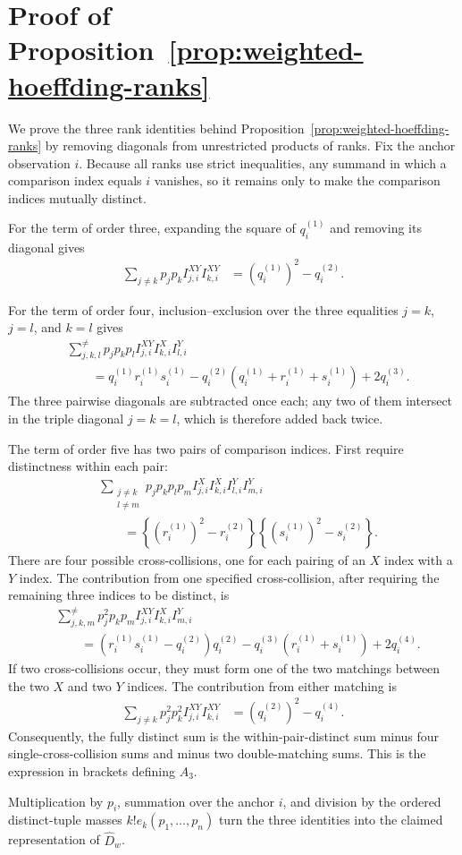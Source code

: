 \section{Proof of Proposition~\ref{prop:weighted-hoeffding-ranks}}
\label{app:hoeffding-identities}

We prove the three rank identities behind
Proposition~\ref{prop:weighted-hoeffding-ranks} by removing diagonals from
unrestricted products of ranks. Fix the anchor observation $i$. Because all
ranks use strict inequalities, any summand in which a comparison index equals
$i$ vanishes, so it remains only to make the comparison indices mutually
distinct.

For the term of order three, expanding the square of $q_i^{(1)}$ and removing
its diagonal gives
\begin{align*}
  \sum_{j\neq k}
  p_jp_k I_{j,i}^{XY}I_{k,i}^{XY}
  &= \left(q_i^{(1)}\right)^2-q_i^{(2)}.
\end{align*}

For the term of order four, inclusion--exclusion over the three equalities
$j=k$, $j=l$, and $k=l$ gives
\begin{align*}
  &\sum_{j,k,l}^{\neq}
  p_jp_kp_l I_{j,i}^{XY}I_{k,i}^X I_{l,i}^Y\\
  &\qquad=
  q_i^{(1)}r_i^{(1)}s_i^{(1)}
  -q_i^{(2)}
   \left(q_i^{(1)}+r_i^{(1)}+s_i^{(1)}\right)
  +2q_i^{(3)}.
\end{align*}
The three pairwise diagonals are subtracted once each; any two of them
intersect in the triple diagonal $j=k=l$, which is therefore added back
twice.

The term of order five has two pairs of comparison indices. First require
distinctness within each pair:
\begin{align*}
  &\sum_{\substack{j\neq k\\l\neq m}}
  p_jp_kp_lp_m I_{j,i}^X I_{k,i}^X I_{l,i}^Y I_{m,i}^Y\\
  &\qquad=
  \left\{\left(r_i^{(1)}\right)^2-r_i^{(2)}\right\}
  \left\{\left(s_i^{(1)}\right)^2-s_i^{(2)}\right\}.
\end{align*}
There are four possible cross-collisions, one for each pairing of an $X$
index with a $Y$ index. The contribution from one specified cross-collision,
after requiring the remaining three indices to be distinct, is
\begin{align*}
  &\sum_{j,k,m}^{\neq}
  p_j^2p_kp_m I_{j,i}^{XY}I_{k,i}^X I_{m,i}^Y\\
  &\qquad=
  \left(r_i^{(1)}s_i^{(1)}-q_i^{(2)}\right)q_i^{(2)}
  -q_i^{(3)}\left(r_i^{(1)}+s_i^{(1)}\right)
  +2q_i^{(4)}.
\end{align*}
If two cross-collisions occur, they must form one of the two matchings between
the two $X$ and two $Y$ indices. The contribution from either matching is
\begin{align*}
  \sum_{j\neq k}p_j^2p_k^2 I_{j,i}^{XY}I_{k,i}^{XY}
  &= \left(q_i^{(2)}\right)^2-q_i^{(4)}.
\end{align*}
Consequently, the fully distinct sum is the within-pair-distinct sum minus
four single-cross-collision sums and minus two double-matching sums. This is
the expression in brackets defining $A_3$.

Multiplication by $p_i$, summation over the anchor $i$, and division by the
ordered distinct-tuple masses $k!e_k(p_1,\ldots,p_n)$ turn the three
identities into the claimed representation of $\widehat D_w$.
